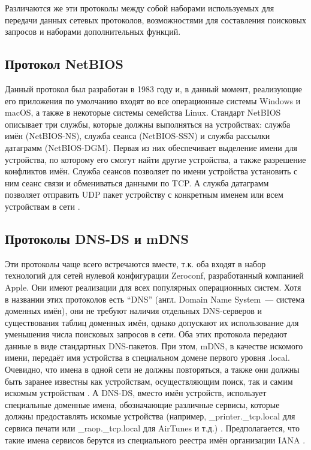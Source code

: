 
Различаются же эти протоколы между собой наборами используемых для передачи данных сетевых протоколов, возможностями для составления поисковых запросов и наборами дополнительных функций.

\subsection{Протокол NetBIOS}
Данный протокол был разработан в 1983 году и, в данный момент, реализующие его приложения по умолчанию входят во все операционные системы Windows и macOS, а также в некоторые системы семейства Linux.
Стандарт NetBIOS описывает три службы, которые должны выполняться на устройствах: служба имён (NetBIOS-NS), служба сеанса (NetBIOS-SSN) и служба рассылки датаграмм (NetBIOS-DGM).
Первая из них обеспечивает выделение имени для устройства, по которому его смогут найти другие устройства, а также разрешение конфликтов имён.
Служба сеансов позволяет по имени устройства установить с ним сеанс связи и обмениваться данными по TCP.
А служба датаграмм позволяет отправить UDP пакет устройству с конкретным именем или всем устройствам в сети \cite{web:netbios}.

\subsection{Протоколы DNS-DS и mDNS}
Эти протоколы чаще всего встречаются вместе, т.к. оба входят в набор технологий для сетей нулевой конфигурации Zeroconf, разработанный компанией Apple.
Они имеют реализации для всех популярных операционных систем.
Хотя в названии этих протоколов есть "`DNS"' (англ. Domain Name System~--- система доменных имён), они не требуют наличия отдельных DNS-серверов и существования таблиц доменных имён, однако допускают их использование для уменьшения числа поисковых запросов в сети.
Оба этих протокола передают данные в виде стандартных DNS-пакетов.
При этом, mDNS, в качестве искомого имени, передаёт имя устройства в специальном домене первого уровня .local.
Очевидно, что имена в одной сети не должны повторяться, а также они должны быть заранее известны как устройствам, осуществляющим поиск, так и самим искомым устройствам \cite{web:dns-ds,web:mdns}.
А DNS-DS, вместо имён устройств, использует специальные доменные имена, обозначающие различные сервисы, которые должны предоставлять искомые устройства (например, {\_}printer.{\_}tcp.local для сервиса печати или {\_}raop.{\_}tcp.local для AirTunes и т.д.) \cite{web:dns-ds, book:zero-conf-guide}.
Предполагается, что такие имена сервисов берутся из специального реестра имён организации IANA \cite{web:iana-dns-ds}.

